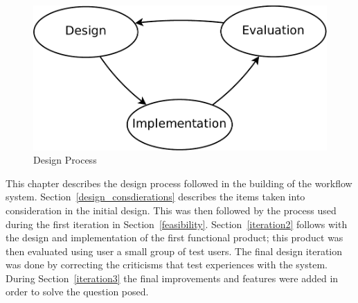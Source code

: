\documentclass[12pt,a4paper]{report}
\begin{document}
\begin{figure}[!h]
\begin{center}
\includegraphics[scale=0.5]{figures/design_cycle.pdf}
\end{center}
\caption{Design Process}
\label{design_figure}
\end{figure}

\noindent This chapter describes the design process followed in the building
of the workflow system. Section~\ref{design_consdierations} describes
the items taken into consideration in the initial design. This was then
followed by the process used during the first iteration in Section~\ref{feasibility}.
Section~\ref{iteration2} follows with the design and implementation of the
first functional product; this product was then evaluated using user a small
group of test users.
The final design iteration was done by correcting the criticisms that test
experiences with the system. During Section~\ref{iteration3} the final
improvements and features were added in order to solve the question posed.
\end{document}
